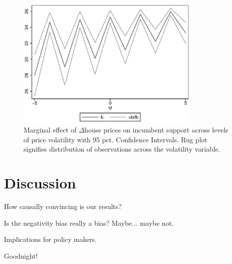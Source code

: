 \documentclass[12pt,a4paper]{article}
\begin{document}
\begin{figure}
	\includegraphics[width=0.8\textwidth]{../figures/volatilityinteraction.eps}
	\centering
	\caption{Marginal effect of $\Delta$house prices on incumbent support across levels of price volatility with 95 pct. Confidence Intervals. Rug plot signifies distribution of observations across the volatility variable.}
\end{figure}






\section{Discussion}

How causally convincing is our results?

Is the negativity bias really a bias? Maybe... maybe not.

Implications for policy makers.

Goodnight!








\clearpage

\singlespacing



\end{document}
